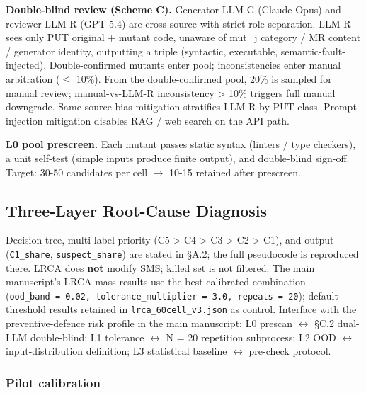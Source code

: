 \documentclass[manuscript,screen,review]{acmart}
\begin{document}
\textbf{Double-blind review (Scheme C).} Generator LLM-G (Claude Opus)
and reviewer LLM-R (GPT-5.4) are cross-source with strict role
separation. LLM-R sees only PUT original + mutant code, unaware of
mut\_j category / MR content / generator identity, outputting a triple
(syntactic, executable, semantic-fault-injected). Double-confirmed
mutants enter pool; inconsistencies enter manual arbitration ($\leq$ 10\%).
From the double-confirmed pool, 20\% is sampled for manual review;
manual-vs-LLM-R inconsistency \textgreater{} 10\% triggers full manual
downgrade. Same-source bias mitigation stratifies LLM-R by PUT class.
Prompt-injection mitigation disables RAG / web search on the API path.

\textbf{L0 pool prescreen.} Each mutant passes static syntax (linters /
type checkers), a unit self-test (simple inputs produce finite output),
and double-blind sign-off. Target: 30-50 candidates per cell $\to$ 10-15
retained after prescreen.

\subsection{Three-Layer Root-Cause Diagnosis}\label{c.4-lrca-three-layer-execution-full}

Decision tree, multi-label priority (C5 \textgreater{} C4 \textgreater{}
C3 \textgreater{} C2 \textgreater{} C1), and output (\texttt{C1\_share},
\texttt{suspect\_share}) are stated in §A.2; the full pseudocode is
reproduced there. LRCA does \textbf{not} modify SMS; killed set is not
filtered. The main manuscript's LRCA-mass results use the best calibrated combination
(\texttt{ood\_band\ =\ 0.02,\ tolerance\_multiplier\ =\ 3.0,\ repeats\ =\ 20});
default-threshold results retained in \texttt{lrca\_60cell\_v3.json} as
control. Interface with the preventive-defence risk profile in the main manuscript: L0 prescan $\leftrightarrow$ §C.2 dual-LLM
double-blind; L1 tolerance $\leftrightarrow$ N = 20 repetition subprocess; L2 OOD $\leftrightarrow$
input-distribution definition; L3 statistical baseline $\leftrightarrow$ pre-check
protocol.

\subsubsection{Pilot calibration}\label{c.4.1-pilot-calibration-37-operators-k-1020}
\end{document}
